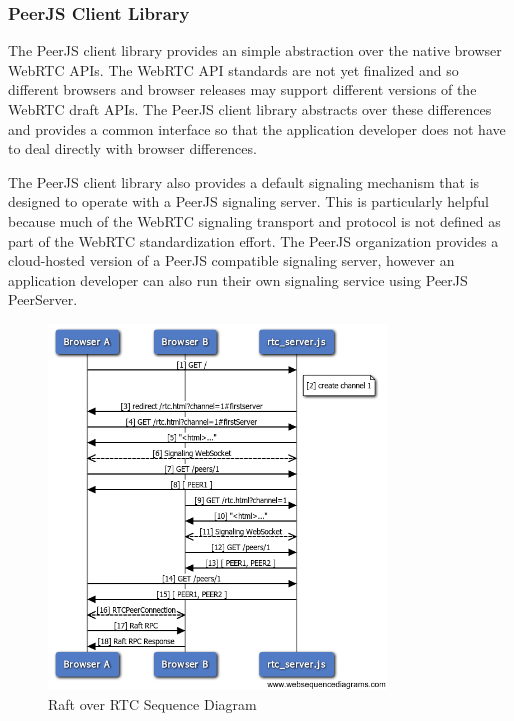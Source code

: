 \documentclass[9pt]{extarticle}
\begin{document}
\begin{multicols}{2}
\subsubsection{PeerJS Client Library}

The PeerJS client library provides an simple abstraction over the
native browser WebRTC APIs. The WebRTC API standards are not yet
finalized and so different browsers and browser releases may support
different versions of the WebRTC draft APIs. %
The PeerJS client library abstracts over these differences and
provides a common interface so that the application developer does not
have to deal directly with browser differences.

The PeerJS client library also provides a default signaling mechanism
that is designed to operate with a PeerJS signaling server. This is
particularly helpful because much of the WebRTC signaling transport
and protocol is not defined as part of the WebRTC standardization
effort. %
The PeerJS organization provides a cloud-hosted version of a PeerJS
compatible signaling server, however an application developer can also
run their own signaling service using PeerJS PeerServer.


\end{multicols}

\begin{figure}[h]
\centerline{\includegraphics[width=0.8\textwidth]{imgs/raft_rtc_sequence}}
\caption{Raft over RTC Sequence Diagram}
  \label{fig:raft_rtc_sequence}
\end{figure}
\end{document}
